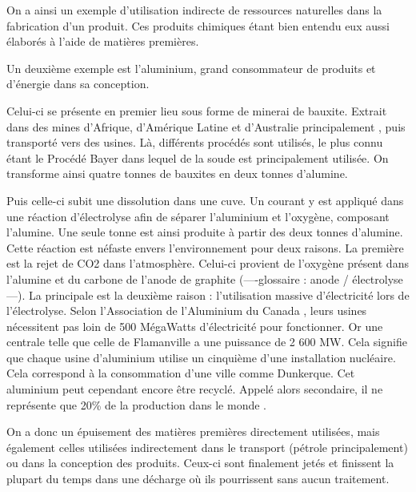 On a ainsi un exemple d'utilisation indirecte de ressources naturelles dans la fabrication d'un produit. Ces produits chimiques étant bien entendu eux aussi élaborés à l'aide de matières premières. 

\medbreak Un deuxième exemple est l'aluminium, grand consommateur de produits et d’énergie dans sa conception.

Celui-ci se présente en premier lieu sous forme de minerai de bauxite. Extrait dans des mines d'Afrique, d'Amérique Latine et d'Australie principalement \cite{aluZonesExtraction}, puis transporté vers des usines. Là, différents procédés sont utilisés, le plus connu étant le Procédé Bayer dans lequel de la soude est principalement utilisée. On transforme ainsi quatre tonnes de bauxites en deux tonnes d'alumine. 

Puis celle-ci subit une dissolution dans une cuve. Un courant y est appliqué dans une réaction d'électrolyse afin de séparer l'aluminium et l'oxygène, composant l'alumine. Une seule tonne est ainsi produite à partir des deux tonnes d'alumine. Cette réaction est néfaste envers l'environnement pour deux raisons. La première est la rejet de CO2 dans l'atmosphère. Celui-ci provient de l'oxygène présent dans l'alumine et du carbone de l'anode de graphite (----glossaire : anode / électrolyse ---). La principale est la deuxième raison : l'utilisation massive d’électricité lors de l'électrolyse. Selon l'Association de l'Aluminium du Canada \cite{consomUsinesAlu}, leurs usines nécessitent pas loin de 500 MégaWatts d’électricité pour fonctionner. Or une centrale telle que celle de Flamanville a une puissance de 2 600 MW. Cela signifie que chaque usine d'aluminium utilise un cinquième d'une installation nucléaire. Cela correspond à la consommation d'une ville comme Dunkerque.
Cet aluminium peut cependant encore être recyclé. Appelé alors secondaire, il ne représente que 20\% de la production dans le monde \cite{worldAluProdRecycl}. 

\bigbreak On a donc un épuisement des matières premières directement utilisées, mais également celles utilisées indirectement dans le transport (pétrole principalement) ou dans la conception des produits. Ceux-ci sont finalement jetés et finissent la plupart du temps dans une décharge où ils pourrissent sans aucun traitement.

